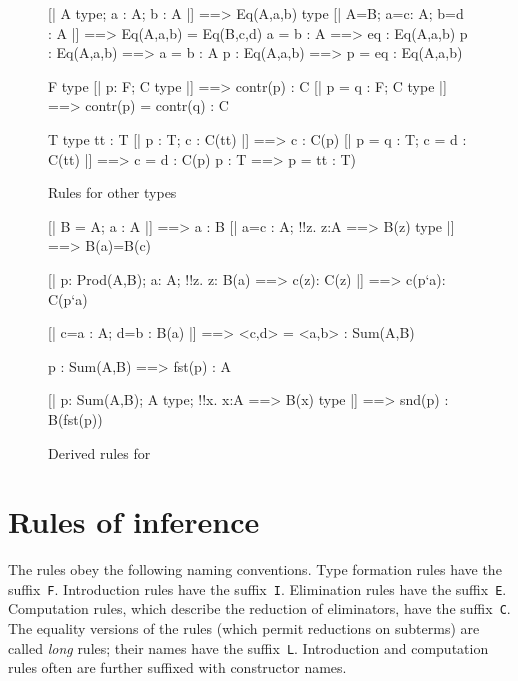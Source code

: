 \begin{figure} 
\begin{ttbox}
       [| A type;  a : A;  b : A |] ==> Eq(A,a,b) type
      [| A=B;  a=c: A;  b=d : A |] ==> Eq(A,a,b) = Eq(B,c,d)
       a = b : A ==> eq : Eq(A,a,b)
       p : Eq(A,a,b) ==> a = b : A
       p : Eq(A,a,b) ==> p = eq : Eq(A,a,b)
\end{ttbox}

\begin{ttbox}
        F type
        [| p: F;  C type |] ==> contr(p) : C
       [| p = q : F;  C type |] ==> contr(p) = contr(q) : C
\end{ttbox}

\begin{ttbox}
        T type
        tt : T
        [| p : T;  c : C(tt) |] ==> c : C(p)
       [| p = q : T;  c = d : C(tt) |] ==> c = d : C(p)
        p : T ==> p = tt : T)
\end{ttbox}

\caption{Rules for other {\CTT} types} \label{ctt-others}
\end{figure}



\begin{figure} 
\begin{ttbox}
    [| B = A;  a : A |] ==> a : B
  [| a=c : A;  !!z. z:A ==> B(z) type |] ==> B(a)=B(c)

     [| p: Prod(A,B);  a: A;  !!z. z: B(a) ==> c(z): C(z)
                |] ==> c(p`a): C(p`a)

    [| c=a : A;  d=b : B(a) |] ==> <c,d> = <a,b> : Sum(A,B)

  p : Sum(A,B) ==> fst(p) : A

  [| p: Sum(A,B);  A type;  !!x. x:A ==> B(x) type
          |] ==> snd(p) : B(fst(p))
\end{ttbox}

\caption{Derived rules for {\CTT}} \label{ctt-derived}
\end{figure}


\section{Rules of inference}
The rules obey the following naming conventions.  Type formation rules have
the suffix~{\tt F}\@.  Introduction rules have the suffix~{\tt I}\@.
Elimination rules have the suffix~{\tt E}\@.  Computation rules, which
describe the reduction of eliminators, have the suffix~{\tt C}\@.  The
equality versions of the rules (which permit reductions on subterms) are
called {\em long} rules; their names have the suffix~{\tt L}\@.
Introduction and computation rules often are further suffixed with
constructor names.

